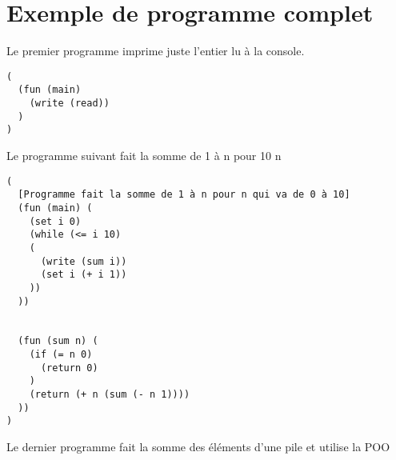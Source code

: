 \section{Exemple de programme complet}
Le premier programme imprime juste l'entier lu à la console.

\begin{verbatim}
(
  (fun (main) 
    (write (read))
  )
)
\end{verbatim}

Le programme suivant fait la somme de 1 à n pour 10 n
\begin{verbatim}
(
  [Programme fait la somme de 1 à n pour n qui va de 0 à 10]
  (fun (main) (
    (set i 0)
    (while (<= i 10)
    (
      (write (sum i))
      (set i (+ i 1))
    ))
  ))


  (fun (sum n) (
    (if (= n 0)
      (return 0)
    )
    (return (+ n (sum (- n 1))))
  ))
)

\end{verbatim}

Le dernier programme fait la somme des éléments d'une pile et utilise la POO




 